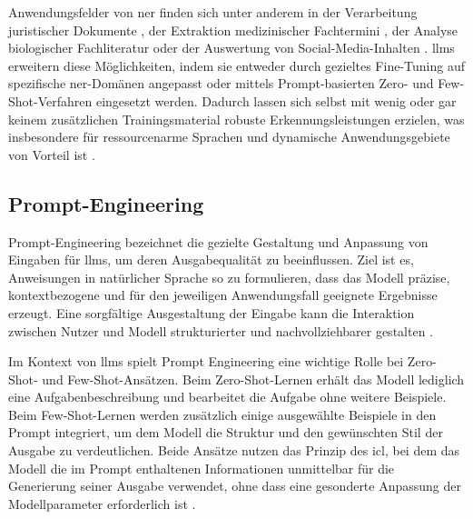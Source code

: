 Anwendungsfelder von \gls{ner} finden sich unter anderem in der Verarbeitung juristischer Dokumente \autocite{breton_empowering_2024}, der Extraktion medizinischer Fachtermini \autocite{islam_llm-based_2025}, der Analyse biologischer Fachliteratur \autocite{lee_biobert_2020} oder der Auswertung von Social-Media-Inhalten \autocite{niu_osint_2025}.
\glspl{llm} erweitern diese Möglichkeiten, indem sie entweder durch gezieltes Fine-Tuning \autocite{dunn_structured_2022} auf spezifische \gls{ner}-Domänen angepasst oder mittels Prompt-basierten Zero- und Few-Shot-Verfahren \autocite{villena_llmner_2024,cheng_novel_2024,wei_chatie_2024} eingesetzt werden.
Dadurch lassen sich selbst mit wenig oder gar keinem zusätzlichen Trainingsmaterial robuste Erkennungsleistungen erzielen, was insbesondere für ressourcenarme Sprachen und dynamische Anwendungsgebiete von Vorteil ist \autocite{pakhale_comprehensive_2023}.


\subsection{Prompt-Engineering}

Prompt-Engineering bezeichnet die gezielte Gestaltung und Anpassung von Eingaben für \glspl{llm}, um deren Ausgabequalität zu beeinflussen.
Ziel ist es, Anweisungen in natürlicher Sprache so zu formulieren, dass das Modell präzise, kontextbezogene und für den jeweiligen Anwendungsfall geeignete Ergebnisse erzeugt.
Eine sorgfältige Ausgestaltung der Eingabe kann die Interaktion zwischen Nutzer und Modell strukturierter und nachvollziehbarer gestalten \autocite{chan_generative_2024}.

Im Kontext von \glspl{llm} spielt Prompt Engineering eine wichtige Rolle bei Zero-Shot- und Few-Shot-Ansätzen.
Beim Zero-Shot-Lernen erhält das Modell lediglich eine Aufgabenbeschreibung und bearbeitet die Aufgabe ohne weitere Beispiele.
Beim Few-Shot-Lernen werden zusätzlich einige ausgewählte Beispiele in den Prompt integriert, um dem Modell die Struktur und den gewünschten Stil der Ausgabe zu verdeutlichen.
Beide Ansätze nutzen das Prinzip des \gls{icl}, bei dem das Modell die im Prompt enthaltenen Informationen unmittelbar für die Generierung seiner Ausgabe verwendet, ohne dass eine gesonderte Anpassung der Modellparameter erforderlich ist \autocite{villena_llmner_2024}.

